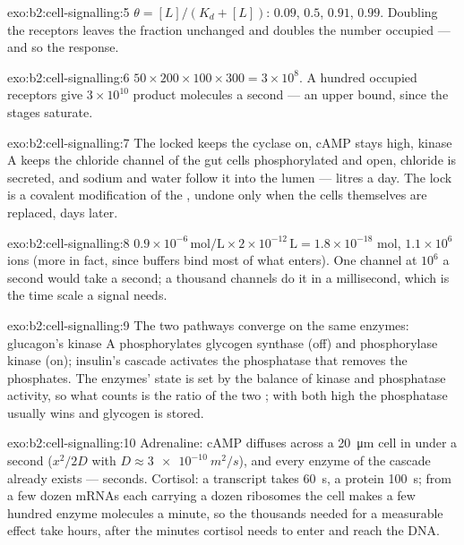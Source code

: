 \begin{solution}{exo:b2:cell-signalling:5}
$\theta = [L]/(K_d + [L])$: $0.09$, $0.5$, $0.91$, $0.99$. Doubling the
receptors leaves the fraction unchanged and doubles the number
occupied --- and so the response.
\end{solution}

\begin{solution}{exo:b2:cell-signalling:6}
$50\times 200\times 100\times 300 = 3\times 10^{8}$. A hundred occupied
receptors give $3\times 10^{10}$ product molecules a second --- an
upper bound, since the stages saturate.
\end{solution}

\begin{solution}{exo:b2:cell-signalling:7}
The locked  keeps the cyclase on, cAMP stays high, kinase A
keeps the chloride channel of the gut cells phosphorylated and
open, chloride is secreted, and sodium and water follow it into the
lumen --- litres a day. The lock is a covalent modification of the , undone only when the cells themselves are replaced, days
later.
\end{solution}

\begin{solution}{exo:b2:cell-signalling:8}
$0.9\times 10^{-6}\,\text{mol/L}\times 2\times 10^{-12}\,\text{L} =
1.8\times 10^{-18}$ mol, $1.1\times 10^{6}$ ions (more in fact, since
buffers bind most of what enters). One channel at $10^{6}$ a second
would take a second; a thousand channels do it in a millisecond,
which is the time scale a signal needs.
\end{solution}

\begin{solution}{exo:b2:cell-signalling:9}
The two pathways converge on the same enzymes: glucagon's kinase A
phosphorylates glycogen synthase (off) and phosphorylase kinase
(on); insulin's cascade activates the phosphatase that removes the
phosphates. The enzymes' state is set by the balance of kinase and
phosphatase activity, so what counts is the ratio of the two
; with both high the phosphatase usually wins and glycogen
is stored.
\end{solution}

\begin{solution}{exo:b2:cell-signalling:10}
Adrenaline: cAMP diffuses across a \qty{20}{\micro m} cell in under a
second ($x^{2}/2D$ with $D \approx \qty{3e-10}{m^2/s}$), and every
enzyme of the cascade already exists --- seconds. Cortisol: a
transcript takes \qty{60}{s}, a protein \qty{100}{s}; from a few
dozen mRNAs each carrying a dozen ribosomes the cell makes a few
hundred enzyme molecules a minute, so the thousands needed for a
measurable effect take hours, after the minutes cortisol needs to
enter and reach the DNA.
\end{solution}

